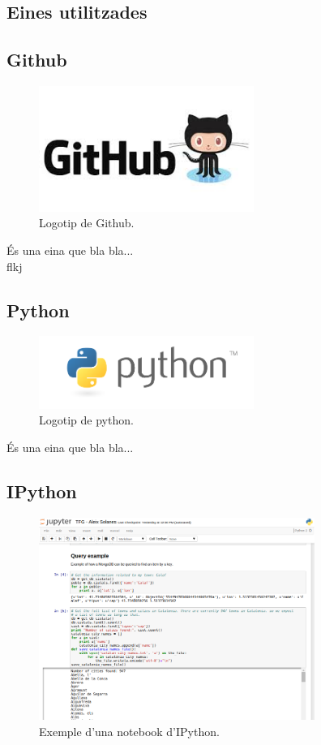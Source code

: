 \documentclass[12pt,a4paper,openright,oneside]{article}
\numberwithin{equation}{section}
\theoremstyle{definition}
\begin{document}
\subsection{Eines utilitzades}
\subsection*{Github}
\begin{figure}[htbp]
\centering
\includegraphics[width=7cm]{github.jpg}
\caption{Logotip de Github.}
\end{figure}
És una eina que bla bla...\\
flkj
\subsection*{Python}
\begin{figure}[htbp]
\centering
\includegraphics[width=7cm]{python.png}
\caption{Logotip de python.}
\end{figure}
És una eina que bla bla...
\newpage
\subsection*{IPython}
\begin{figure}[htbp]
\centering
\includegraphics[width=9cm]{ipython.png}
\caption{Exemple d'una notebook d'IPython.}
\end{figure}
\end{document}
